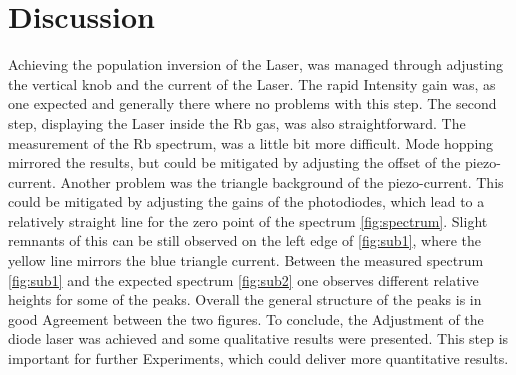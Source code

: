 \section{Discussion}
Achieving the population inversion of the Laser, was managed through adjusting the vertical knob and the current of the Laser. The rapid Intensity gain was, as one expected and generally there where no problems with this step.
The second step, displaying the Laser inside the Rb gas, was also straightforward. 
The measurement of the Rb spectrum, was a little bit more difficult. Mode hopping mirrored the results, but could be mitigated by  adjusting the offset of the piezo-current. 
Another problem was the triangle background of the piezo-current. This could be mitigated by adjusting the gains of the photodiodes, which lead to a relatively straight line for the zero point of the spectrum \ref{fig:spectrum}.
Slight remnants of this can be still observed on the left edge of \ref{fig:sub1}, where the yellow line mirrors the blue triangle current. Between the measured spectrum \ref{fig:sub1} and the expected spectrum \ref{fig:sub2} one observes different relative heights for some of the peaks. 
Overall the general structure of the peaks is in good Agreement between the two figures. 
To conclude, the Adjustment of the diode laser was achieved and some qualitative results were presented. This step is important for further Experiments, which could deliver more quantitative results.

